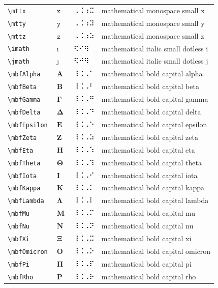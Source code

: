 \documentclass[oneside]{article}
\begin{document}
\begin{longtable}{llll}
\verb|\mttx| & $\mttx$ &  ⠠⠨⠰⠭  & {mathematical monospace small x} \\[2ex]
\verb|\mtty| & $\mtty$ &  ⠠⠨⠰⠽  & {mathematical monospace small y} \\[2ex]
\verb|\mttz| & $\mttz$ &  ⠠⠨⠰⠵  & {mathematical monospace small z} \\[2ex]
\verb|\imath| & $\imath$ &  ⠫⠊⠻  & {mathematical italic small dotless i} \\[2ex]
\verb|\jmath| & $\jmath$ &  ⠫⠚⠻  & {mathematical italic small dotless j} \\[2ex]
\verb|\mbfAlpha| & $\mbfAlpha$ &  ⠸⠨⠠⠁  & {mathematical bold capital alpha} \\[2ex]
\verb|\mbfBeta| & $\mbfBeta$ &  ⠸⠨⠠⠃  & {mathematical bold capital beta} \\[2ex]
\verb|\mbfGamma| & $\mbfGamma$ &  ⠸⠨⠠⠛  & {mathematical bold capital gamma} \\[2ex]
\verb|\mbfDelta| & $\mbfDelta$ &  ⠸⠨⠠⠙  & {mathematical bold capital delta} \\[2ex]
\verb|\mbfEpsilon| & $\mbfEpsilon$ &  ⠸⠨⠠⠑  & {mathematical bold capital epsilon} \\[2ex]
\verb|\mbfZeta| & $\mbfZeta$ &  ⠸⠨⠠⠵  & {mathematical bold capital zeta} \\[2ex]
\verb|\mbfEta| & $\mbfEta$ &  ⠸⠨⠠⠱  & {mathematical bold capital eta} \\[2ex]
\verb|\mbfTheta| & $\mbfTheta$ &  ⠸⠨⠠⠹  & {mathematical bold capital theta} \\[2ex]
\verb|\mbfIota| & $\mbfIota$ &  ⠸⠨⠠⠊  & {mathematical bold capital iota} \\[2ex]
\verb|\mbfKappa| & $\mbfKappa$ &  ⠸⠨⠠⠅  & {mathematical bold capital kappa} \\[2ex]
\verb|\mbfLambda| & $\mbfLambda$ &  ⠸⠨⠠⠇  & {mathematical bold capital lambda} \\[2ex]
\verb|\mbfMu| & $\mbfMu$ &  ⠸⠨⠠⠍  & {mathematical bold capital mu} \\[2ex]
\verb|\mbfNu| & $\mbfNu$ &  ⠸⠨⠠⠝  & {mathematical bold capital nu} \\[2ex]
\verb|\mbfXi| & $\mbfXi$ &  ⠸⠨⠠⠭  & {mathematical bold capital xi} \\[2ex]
\verb|\mbfOmicron| & $\mbfOmicron$ &  ⠸⠨⠠⠕  & {mathematical bold capital omicron} \\[2ex]
\verb|\mbfPi| & $\mbfPi$ &  ⠸⠨⠠⠏  & {mathematical bold capital pi} \\[2ex]
\verb|\mbfRho| & $\mbfRho$ &  ⠸⠨⠠⠗  & {mathematical bold capital rho} \\[2ex]

\end{longtable}
\end{document}
